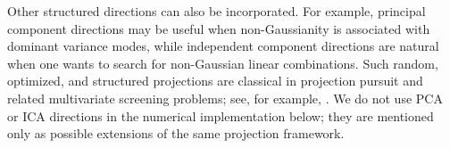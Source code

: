 \documentclass[11pt]{article}
\theoremstyle{plain}
\theoremstyle{definition}
\theoremstyle{remark}
\def\u{\bm{u}}
\newcommand{\sd}[1]{{\color{red}(SD: #1)}}
\begin{document}
Other structured directions can also be incorporated. For example, principal component directions may be useful when non-Gaussianity is associated with dominant variance modes, while independent component directions are natural when one wants to search for non-Gaussian linear combinations. Such random, optimized, and structured projections are classical in projection pursuit and related multivariate screening problems; see, for example, \citet{friedman1974projection,diaconis1984asymptotics,pena2001multivariate,hyvarinen2001ica,loperfido2018skewness}. We do not use PCA or ICA directions in the numerical implementation below; they are mentioned only as possible extensions of the same projection framework.




\end{document}
